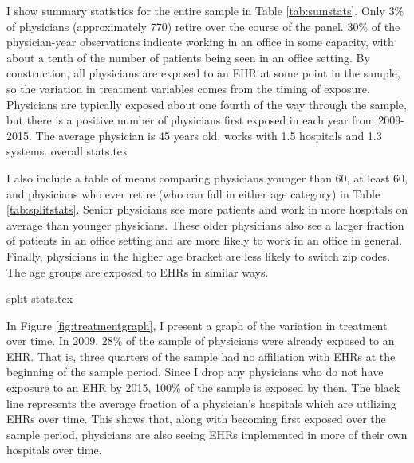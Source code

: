 \documentclass[12pt]{article}
\begin{document}
I show summary statistics for the entire sample in Table \ref{tab:sumstats}. Only 3\% of physicians (approximately 770) retire over the course of the panel. 30\% of the physician-year observations indicate working in an office in some capacity, with about a tenth of the number of patients being seen in an office setting. By construction, all physicians are exposed to an EHR at some point in the sample, so the variation in treatment variables comes from the timing of exposure. Physicians are typically exposed about one fourth of the way through the sample, but there is a positive number of physicians first exposed in each year from 2009-2015. The average physician is 45 years old, works with 1.5 hospitals and 1.3 systems. 
{overall stats.tex}


I also include a table of means comparing physicians younger than 60, at least 60, and physicians who ever retire (who can fall in either age category) in Table \ref{tab:splitstats}. Senior physicians see more patients and work in more hospitals on average than younger physicians. These older physicians also see a larger fraction of patients in an office setting and are more likely to work in an office in general. Finally, physicians in the higher age bracket are less likely to switch zip codes. The age groups are exposed to EHRs in similar ways.


{split stats.tex}


In Figure \ref{fig:treatmentgraph}, I present a graph of the variation in treatment over time. In 2009, 28\% of the sample of physicians were already exposed to an EHR. That is, three quarters of the sample had no affiliation with EHRs at the beginning of the sample period. Since I drop any physicians who do not have exposure to an EHR by 2015, 100\% of the sample is exposed by then. The black line represents the average fraction of a physician's hospitals which are utilizing EHRs over time. This shows that, along with becoming first exposed over the sample period, physicians are also seeing EHRs implemented in more of their own hospitals over time.
\end{document}

